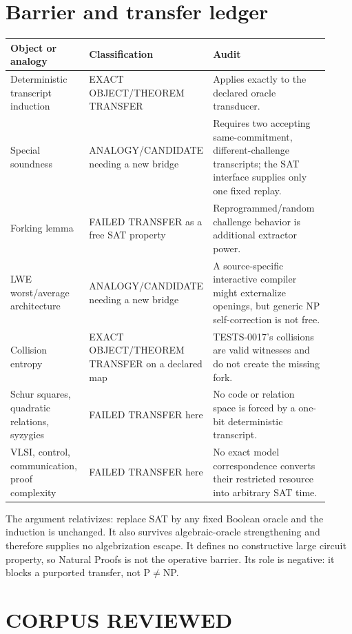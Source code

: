 \documentclass[11pt]{article}
\begin{document}
\section*{Barrier and transfer ledger}

\begin{center}
\begin{tabular}{p{0.27\linewidth}p{0.23\linewidth}p{0.42\linewidth}}
\toprule
Object or analogy & Classification & Audit \\
\midrule
Deterministic transcript induction & EXACT OBJECT/THEOREM TRANSFER & Applies exactly to the declared oracle transducer. \\
Special soundness & ANALOGY/CANDIDATE needing a new bridge & Requires two accepting same-commitment, different-challenge transcripts; the SAT interface supplies only one fixed replay. \\
Forking lemma & FAILED TRANSFER as a free SAT property & Reprogrammed/random challenge behavior is additional extractor power. \\
LWE worst/average architecture & ANALOGY/CANDIDATE needing a new bridge & A source-specific interactive compiler might externalize openings, but generic NP self-correction is not free. \\
Collision entropy & EXACT OBJECT/THEOREM TRANSFER on a declared map & TESTS-0017's collisions are valid witnesses and do not create the missing fork. \\
Schur squares, quadratic relations, syzygies & FAILED TRANSFER here & No code or relation space is forced by a one-bit deterministic transcript. \\
VLSI, control, communication, proof complexity & FAILED TRANSFER here & No exact model correspondence converts their restricted resource into arbitrary SAT time. \\
\bottomrule
\end{tabular}
\end{center}

The argument relativizes: replace SAT by any fixed Boolean oracle and the
induction is unchanged.  It also survives algebraic-oracle strengthening and
therefore supplies no algebrization escape.  It defines no constructive large
circuit property, so Natural Proofs is not the operative barrier.  Its role is
negative: it blocks a purported transfer, not P$\ne$NP.

\section*{CORPUS REVIEWED}
\end{document}
